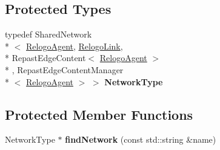 \subsection*{Protected Types}
\begin{DoxyCompactItemize}
\item 
\hypertarget{classrepast_1_1relogo_1_1_observer_a217887f3aa32a6ede5e1e501d68cfe76}{typedef Shared\-Network\\*
$<$ \hyperlink{classrepast_1_1relogo_1_1_relogo_agent}{Relogo\-Agent}, \hyperlink{classrepast_1_1relogo_1_1_relogo_link}{Relogo\-Link}, \\*
Repast\-Edge\-Content$<$ \hyperlink{classrepast_1_1relogo_1_1_relogo_agent}{Relogo\-Agent} $>$\\*
, Repast\-Edge\-Content\-Manager\\*
$<$ \hyperlink{classrepast_1_1relogo_1_1_relogo_agent}{Relogo\-Agent} $>$ $>$ {\bfseries Network\-Type}}\label{classrepast_1_1relogo_1_1_observer_a217887f3aa32a6ede5e1e501d68cfe76}

\end{DoxyCompactItemize}
\subsection*{Protected Member Functions}
\begin{DoxyCompactItemize}
\item 
\hypertarget{classrepast_1_1relogo_1_1_observer_a9a6da36977fc44e0364be1d7032055ca}{Network\-Type $\ast$ {\bfseries find\-Network} (const std\-::string \&name)}\label{classrepast_1_1relogo_1_1_observer_a9a6da36977fc44e0364be1d7032055ca}

\end{DoxyCompactItemize}
